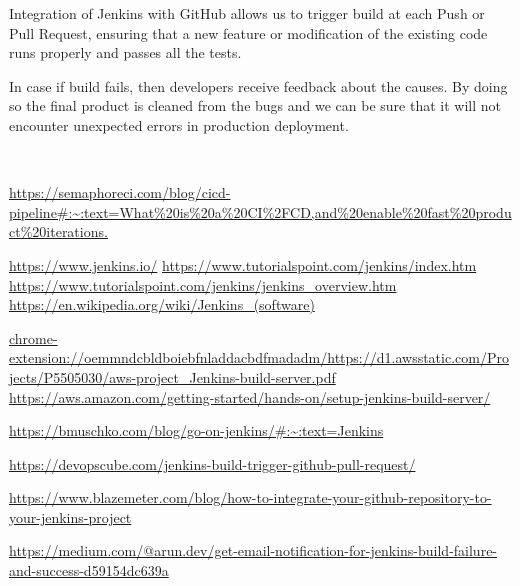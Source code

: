\documentclass[12pt,a4paper,twoside]{article}
\begin{document}
Integration of Jenkins with GitHub allows us to trigger build at each Push or Pull Request, ensuring that a new feature or modification of the existing code runs properly and passes all the tests. 

In case if build fails, then developers receive feedback about the causes. By doing so the final product is cleaned from the bugs and we can be sure that it will not encounter unexpected errors in production deployment.


~\newpage


\begin{thebibliography}{100}

	 \url{https://semaphoreci.com/blog/cicd-pipeline#:~:text=What\%20is\%20a\%20CI\%2FCD,and\%20enable\%20fast\%20product\%20iterations.}	

	\bibitem{} \url{https://www.jenkins.io/}
	\bibitem{} \url{https://www.tutorialspoint.com/jenkins/index.htm}
	 \url{https://www.tutorialspoint.com/jenkins/jenkins_overview.htm}
	\bibitem{} \url{https://en.wikipedia.org/wiki/Jenkins_(software)}

	\bibitem{} \url{chrome-extension://oemmndcbldboiebfnladdacbdfmadadm/https://d1.awsstatic.com/Projects/P5505030/aws-project_Jenkins-build-server.pdf}
	 \url{https://aws.amazon.com/getting-started/hands-on/setup-jenkins-build-server/}

	\bibitem{} \url{https://bmuschko.com/blog/go-on-jenkins/#:~:text=Jenkins}

	\bibitem{} \url{https://devopscube.com/jenkins-build-trigger-github-pull-request/}


	\bibitem{} \url{https://www.blazemeter.com/blog/how-to-integrate-your-github-repository-to-your-jenkins-project}

	\bibitem{} \url{https://medium.com/@arun.dev/get-email-notification-for-jenkins-build-failure-and-success-d59154dc639a}

\end{thebibliography}
\end{document}
